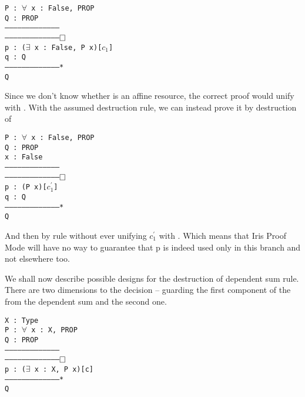 {\begin{minipage}{\linewidth}
\texttt{P : $\forall$ x : False, PROP\\
Q : PROP\\
---------------------------------------\\
---------------------------------------$\mathop{\Box}$\\
p : ($\exists$ x : False, P x)[$c_1$]\\
q : Q\\
---------------------------------------*\\
Q
}
\end{minipage}

Since we don't know whether  is an affine resource, the correct proof would unify  with \false.
With the assumed destruction rule, we can instead prove it by destruction of \\

\begin{minipage}{\linewidth}
\texttt{P : $\forall$ x : False, PROP\\
Q : PROP\\
x : False\\
---------------------------------------\\
---------------------------------------$\mathop{\Box}$\\
p : (P x)[$c^{'}_1$]\\
q : Q\\
---------------------------------------*\\
Q
}
\end{minipage}
And then by  rule without ever unifying $c^{'}_1$ with \true.
Which means that Iris Proof Mode will have no way to guarantee that p is indeed used only in this branch and not elsewhere too.

We shall now describe possible designs for the destruction of dependent sum rule.
There are two dimensions to the decision -- guarding the first component of the from the dependent sum and the second one.

\begin{minipage}{\linewidth}
\texttt{X : Type\\
P : $\forall$ x : X, PROP\\
Q : PROP\\
---------------------------------------\\
---------------------------------------$\mathop{\Box}$\\
p : ($\exists$ x : X, P x)[c]\\
---------------------------------------*\\
Q
}
\end{minipage}

}
